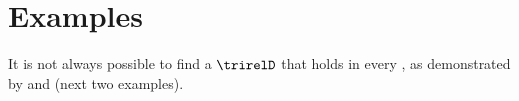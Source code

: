 %

\section{Examples}
It is not always possible to find a   $\trirelD$
that holds in every  , as demonstrated by 
 and  (next two examples).
